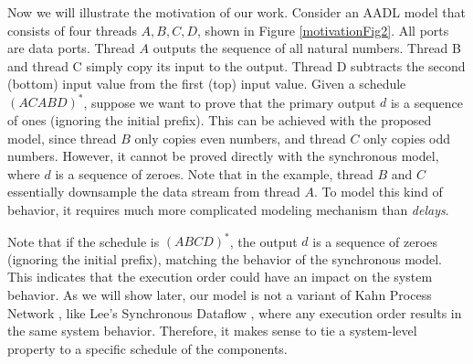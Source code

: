 Now we will illustrate the motivation of our work.
Consider an AADL model that consists of four threads $A, B, C, D$, shown in Figure \ref{motivationFig2}. All ports are data ports. Thread $A$ outputs the sequence of all natural numbers. Thread B and thread C simply copy its input to the output. Thread D subtracts the second (bottom) input value from the first (top) input value. Given a schedule $(ACABD)^*$, suppose we want to prove that the primary output $d$ is a sequence of ones (ignoring the initial prefix). This can be achieved with the proposed model, since thread $B$ only copies even numbers, and thread $C$ only copies odd numbers. However, it cannot be proved directly with the synchronous model, where $d$ is a sequence of zeroes. Note that in the example, thread $B$ and $C$ essentially downsample the data stream from thread $A$. To model this kind of behavior, it requires much more complicated modeling mechanism than \emph{delays}. 

Note that if the schedule is $(ABCD)^*$, the output $d$ is a sequence of zeroes (ignoring the initial prefix), matching the behavior of the synchronous model. This indicates that the execution order could have an impact on the system behavior. As we will show later, our model is not a variant of Kahn Process Network \cite{KPN}, like Lee's Synchronous Dataflow \cite{SDF}, where any execution order results in the same system behavior. Therefore, it makes sense to tie a system-level property to a specific schedule of the components.


 
  